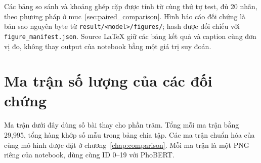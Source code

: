 Các bảng so sánh và khoảng ghép cặp được tính từ cùng thứ tự test, đủ 20 nhãn, theo phương pháp ở mục~\ref{sec:paired_comparison}. Hình báo cáo đối chứng là bản sao nguyên byte từ \texttt{result/<model>/figures/}; hash được đối chiếu với \texttt{figure\_manifest.json}. Source LaTeX giữ các bảng kết quả và caption cùng đơn vị đo, không thay output của notebook bằng một giá trị suy đoán.

\section{Ma trận số lượng của các đối chứng}
Ma trận dưới đây dùng số bài thay cho phần trăm. Tổng mỗi ma trận bằng 29,995, tổng hàng khớp số mẫu trong bảng chia tập. Các ma trận chuẩn hóa của cùng mô hình được đặt ở chương~\ref{chap:comparison}. Mỗi ma trận là một PNG riêng của notebook, dùng cùng ID 0--19 với PhoBERT.

